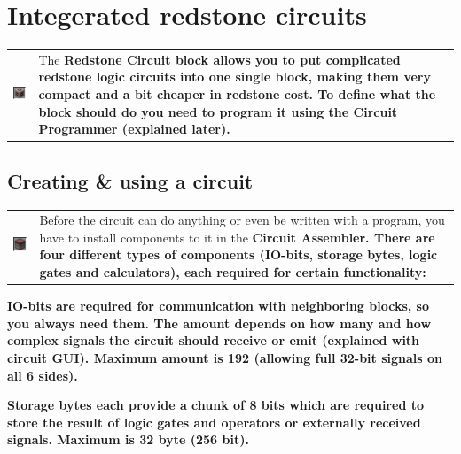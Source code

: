 \documentclass[11pt]{article} %
\makeatletter
\newcommand{\imgtex}{\begin{tabularx}{\textwidth}{@{}c@{ }X@{}}}
\makeatother
\begin{document}
\section{Integerated redstone circuits}
\imgtex
\includegraphics[align = t]{circuit} & The \bf Redstone Circuit \rm block allows you to put complicated redstone logic circuits into one single block, making them very compact and a bit cheaper in redstone cost. To define what the block should do you need to program it using the \bf Circuit Programmer \rm (explained later).\\
\end{tabularx}

\subsection{Creating \& using a circuit}
\imgtex
\includegraphics[align = t]{assembler} & Before the circuit can do anything or even be written with a program, you have to install components to it in the \bf Circuit Assembler\rm . There are four different types of components (IO-bits, storage bytes, logic gates and calculators), each required for certain functionality:\\
\end{tabularx}

\bf IO-bits \rm are required for communication with neighboring blocks, so you always need them. The amount depends on how many and how complex signals the circuit should receive or emit (explained with circuit GUI). Maximum amount is 192 (allowing full 32-bit signals on all 6 sides).

\bf Storage bytes \rm each provide a chunk of 8 bits which are required to store the result of logic gates and operators or externally received signals. Maximum is 32 byte (256 bit). 
\end{document}
